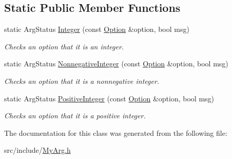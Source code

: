 \subsection*{Static Public Member Functions}
\begin{DoxyCompactItemize}
\item 
\hypertarget{classxmem_1_1config_1_1third__party_1_1_my_arg_aa96164ec393fdb12b359e33ee48e3c64}{}static Arg\+Status \hyperlink{classxmem_1_1config_1_1third__party_1_1_my_arg_aa96164ec393fdb12b359e33ee48e3c64}{Integer} (const \hyperlink{classxmem_1_1config_1_1third__party_1_1_option}{Option} \&option, bool msg)\label{classxmem_1_1config_1_1third__party_1_1_my_arg_aa96164ec393fdb12b359e33ee48e3c64}

\begin{DoxyCompactList}\small\item\em Checks an option that it is an integer. \end{DoxyCompactList}\item 
\hypertarget{classxmem_1_1config_1_1third__party_1_1_my_arg_a51af9350382f12100b5bd6b554c3bcf5}{}static Arg\+Status \hyperlink{classxmem_1_1config_1_1third__party_1_1_my_arg_a51af9350382f12100b5bd6b554c3bcf5}{Nonnegative\+Integer} (const \hyperlink{classxmem_1_1config_1_1third__party_1_1_option}{Option} \&option, bool msg)\label{classxmem_1_1config_1_1third__party_1_1_my_arg_a51af9350382f12100b5bd6b554c3bcf5}

\begin{DoxyCompactList}\small\item\em Checks an option that it is a nonnegative integer. \end{DoxyCompactList}\item 
\hypertarget{classxmem_1_1config_1_1third__party_1_1_my_arg_ad022660b254db34b578eb5b3fc9782a7}{}static Arg\+Status \hyperlink{classxmem_1_1config_1_1third__party_1_1_my_arg_ad022660b254db34b578eb5b3fc9782a7}{Positive\+Integer} (const \hyperlink{classxmem_1_1config_1_1third__party_1_1_option}{Option} \&option, bool msg)\label{classxmem_1_1config_1_1third__party_1_1_my_arg_ad022660b254db34b578eb5b3fc9782a7}

\begin{DoxyCompactList}\small\item\em Checks an option that it is a positive integer. \end{DoxyCompactList}\end{DoxyCompactItemize}


The documentation for this class was generated from the following file\+:\begin{DoxyCompactItemize}
\item 
src/include/\hyperlink{_my_arg_8h}{My\+Arg.\+h}\end{DoxyCompactItemize}
